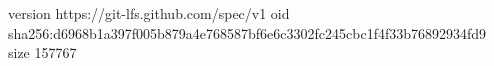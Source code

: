 version https://git-lfs.github.com/spec/v1
oid sha256:d6968b1a397f005b879a4e768587bf6e6c3302fc245cbc1f4f33b76892934fd9
size 157767
